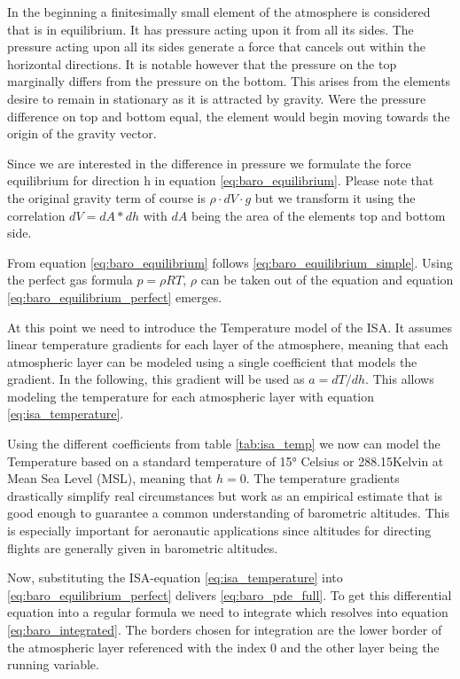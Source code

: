 In the beginning a finitesimally small element of the atmosphere is considered that is in equilibrium. It has pressure acting upon it from all its sides. The pressure acting upon all its sides generate a force that cancels out within the horizontal directions. It is notable however that the pressure on the top marginally differs from the pressure on the bottom. This arises from the elements desire to remain in stationary as it is attracted by gravity. Were the pressure difference on top and bottom equal, the element would begin moving towards the origin of the gravity vector.

Since we are interested in the difference in pressure we formulate the force equilibrium for direction h in equation \ref{eq:baro_equilibrium}. Please note that the original gravity term of course is $\rho \cdot dV \cdot g$ but we transform it using the correlation $dV = dA * dh$ with $dA$ being the area of the elements top and bottom side.

From equation \ref{eq:baro_equilibrium} follows \ref{eq:baro_equilibrium_simple}. Using the perfect gas formula $p=\rho R T$, $\rho$ can be taken out of the equation and equation \ref{eq:baro_equilibrium_perfect} emerges.

At this point we need to introduce the Temperature model of the ISA. It assumes linear temperature gradients for each layer of the atmosphere, meaning that each atmospheric layer can be modeled using a single coefficient that models the gradient. In the following, this gradient will be used as $a=dT/dh$. This allows modeling the temperature for each atmospheric layer with equation \ref{eq:isa_temperature}.

Using the different coefficients from table \ref{tab:isa_temp} we now can model the Temperature based on a standard temperature of 15° Celsius or 288.15Kelvin at Mean Sea Level (MSL), meaning that $h=0$. The temperature gradients drastically simplify real circumstances but work as an empirical estimate that is good enough to guarantee a common understanding of barometric altitudes. This is especially important for aeronautic applications since altitudes for directing flights are generally given in barometric altitudes.

Now, substituting the ISA-equation \ref{eq:isa_temperature} into \ref{eq:baro_equilibrium_perfect} delivers \ref{eq:baro_pde_full}. To get this differential equation into a regular formula we need to integrate which resolves into equation \ref{eq:baro_integrated}. The borders chosen for integration are the lower border of the atmospheric layer referenced with the index 0 and the other layer being the running variable.

